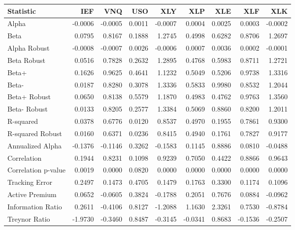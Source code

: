 \begin{tabular}{lrrrrrrrr}
\toprule
Statistic & IEF & VNQ & USO & XLY & XLP & XLE & XLF & XLK \\
\midrule
Alpha & -0.0006 & -0.0005 & 0.0011 & -0.0007 & 0.0004 & 0.0025 & 0.0003 & -0.0002 \\
Beta & 0.0795 & 0.8167 & 0.1888 & 1.2745 & 0.4998 & 0.6282 & 0.8706 & 1.2697 \\
Alpha Robust & -0.0008 & -0.0007 & 0.0026 & -0.0006 & 0.0007 & 0.0036 & 0.0002 & -0.0001 \\
Beta Robust & 0.0516 & 0.7828 & 0.2632 & 1.2895 & 0.4768 & 0.5983 & 0.8711 & 1.2721 \\
Beta+ & 0.1626 & 0.9625 & 0.4641 & 1.1232 & 0.5049 & 0.5206 & 0.9738 & 1.3316 \\
Beta- & 0.0187 & 0.8280 & 0.3078 & 1.3336 & 0.5833 & 0.9980 & 0.8532 & 1.2044 \\
Beta+ Robust & 0.0650 & 0.8138 & 0.5579 & 1.1870 & 0.4983 & 0.4762 & 0.9763 & 1.3560 \\
Beta- Robust & 0.0133 & 0.8205 & 0.2577 & 1.3384 & 0.5069 & 0.8860 & 0.8200 & 1.2011 \\
R-squared & 0.0378 & 0.6776 & 0.0120 & 0.8537 & 0.4970 & 0.1955 & 0.7861 & 0.9300 \\
R-squared Robust & 0.0160 & 0.6371 & 0.0236 & 0.8415 & 0.4940 & 0.1761 & 0.7827 & 0.9177 \\
Annualized Alpha & -0.1376 & -0.1146 & 0.3262 & -0.1583 & 0.1145 & 0.8886 & 0.0810 & -0.0488 \\
Correlation & 0.1944 & 0.8231 & 0.1098 & 0.9239 & 0.7050 & 0.4422 & 0.8866 & 0.9643 \\
Correlation p-value & 0.0019 & 0.0000 & 0.0820 & 0.0000 & 0.0000 & 0.0000 & 0.0000 & 0.0000 \\
Tracking Error & 0.2497 & 0.1473 & 0.4705 & 0.1479 & 0.1763 & 0.3300 & 0.1174 & 0.1096 \\
Active Premium & 0.0652 & -0.0605 & 0.3824 & -0.1788 & 0.2051 & 0.7676 & 0.0884 & -0.0962 \\
Information Ratio & 0.2611 & -0.4106 & 0.8127 & -1.2088 & 1.1630 & 2.3261 & 0.7530 & -0.8784 \\
Treynor Ratio & -1.9730 & -0.3460 & 0.8487 & -0.3145 & -0.0341 & 0.8683 & -0.1536 & -0.2507 \\
\bottomrule
\end{tabular}
